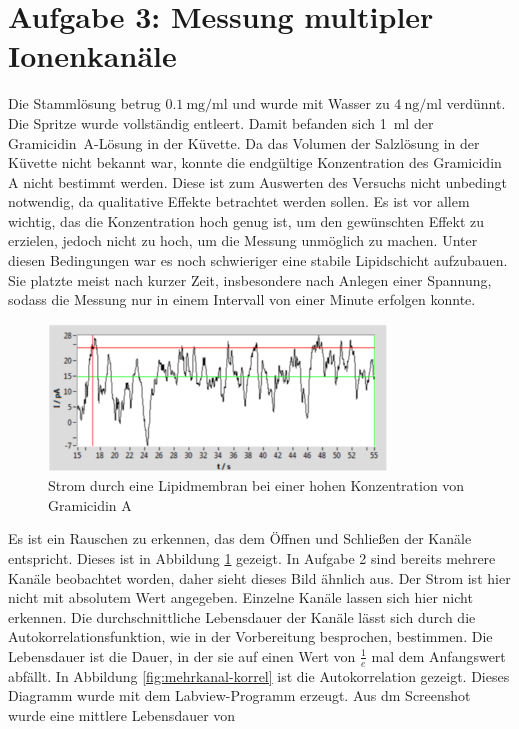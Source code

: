 \documentclass[a4paper,ngerman]{scrartcl}
\begin{document}
\section{Aufgabe 3: Messung multipler Ionenkanäle}

Die Stammlösung betrug $\SI{0.1}{\milli \gram \per \milli \litre}$ und wurde mit Wasser zu $\SI{4}{\nano \gram \per \milli \litre}$ verdünnt.
Die Spritze wurde vollständig entleert. 
Damit befanden sich \SI{1}{\milli \litre} der Gramicidin~A-Lösung in der Küvette.
Da das Volumen der Salzlösung in der Küvette nicht bekannt war, konnte die endgültige Konzentration des Gramicidin A nicht bestimmt werden.
Diese ist zum Auswerten des Versuchs nicht unbedingt notwendig, da qualitative Effekte betrachtet werden sollen.
Es ist vor allem wichtig, das die Konzentration hoch genug ist, um den gewünschten Effekt zu erzielen, jedoch nicht zu hoch, um die Messung unmöglich zu machen.
Unter diesen Bedingungen war es noch schwieriger eine stabile Lipidschicht aufzubauen.
Sie platzte meist nach kurzer Zeit, insbesondere nach Anlegen einer Spannung, sodass die Messung nur in einem Intervall von einer Minute erfolgen konnte.

\begin{figure}[tbh!]
\includegraphics[width=0.8\textwidth]{abbildungen/mehrkanal_raw.png}
\caption{Strom durch eine Lipidmembran bei einer hohen Konzentration von Gramicidin A}
\label{fig:mehrkanal-roh}
\end{figure}


Es ist ein Rauschen zu erkennen, das dem Öffnen und Schließen der Kanäle entspricht. Dieses ist in Abbildung \ref{fig:mehrkanal-roh} gezeigt. In Aufgabe 2 sind bereits mehrere Kanäle beobachtet worden, daher sieht dieses Bild ähnlich aus. Der Strom ist hier nicht mit absolutem Wert angegeben. Einzelne Kanäle lassen sich hier nicht erkennen. Die durchschnittliche Lebensdauer der Kanäle lässt sich durch die Autokorrelationsfunktion, wie in der Vorbereitung besprochen, bestimmen. Die Lebensdauer ist die Dauer, in der sie auf einen Wert von $\frac{1}{e}$ mal dem Anfangswert abfällt. In Abbildung \ref{fig:mehrkanal-korrel} ist die Autokorrelation gezeigt. Dieses Diagramm wurde mit dem Labview-Programm erzeugt. Aus dm Screenshot wurde eine mittlere Lebensdauer von
\end{document}
